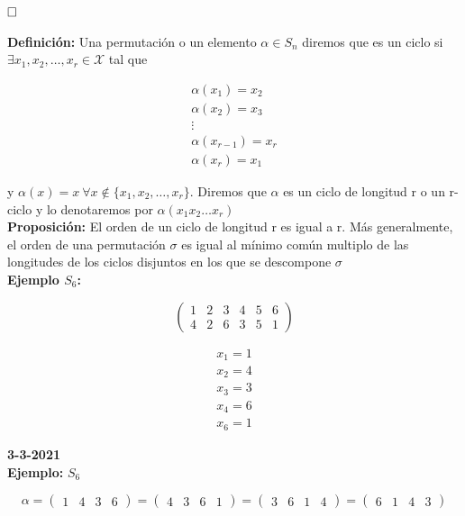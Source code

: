 \documentclass{article}
\begin{document}
$\hfill\square$

\textbf{Definición:} Una permutación o un elemento $\alpha \in S_n$ diremos que es un ciclo si $\exists x_1,x_2,\ldots,x_r\in \mathcal{X}$ tal que

\begin{gather*}
\alpha(x_1)=x_2 \\
\alpha(x_2)=x_3 \\
\vdots \\
\alpha(x_{r-1})=x_r \\
\alpha(x_r)=x_1
\end{gather*}

y $\alpha(x)=x~\forall x \notin \{x_1,x_2,\ldots,x_r\}$. Diremos que $\alpha$ es un ciclo de longitud r o un r-ciclo y lo denotaremos por $\alpha(x_1x_2\ldots x_r)$ \\

\textbf{Proposición:} El orden de un ciclo de longitud r es igual a r. Más generalmente, el orden de una permutación $\sigma$ es igual al mínimo común multiplo de las longitudes de los ciclos disjuntos en los que se descompone $\sigma$ \\

\textbf{Ejemplo $S_6$:}

\begin{equation*}
\begin{pmatrix}
1 & 2 & 3 & 4 & 5 & 6 \\
4 & 2 & 6 & 3 & 5 & 1
\end{pmatrix}
\end{equation*}

\begin{gather*}
x_1=1 \\
x_2=4 \\
x_3=3 \\
x_4=6 \\
x_6=1
\end{gather*}

\textbf{3-3-2021} \\

\textbf{Ejemplo:} $S_6$

\begin{equation*}
\alpha=
\begin{pmatrix}
1 & 4 & 3 & 6
\end{pmatrix}
=
\begin{pmatrix}
4 & 3 & 6 & 1
\end{pmatrix}
=
\begin{pmatrix}
3 & 6 & 1 & 4
\end{pmatrix}
=
\begin{pmatrix}
6 & 1 & 4 & 3
\end{pmatrix}
\end{equation*}
\end{document}
